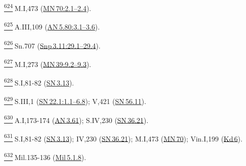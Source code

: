 \label{footprints_split_025.html_fn624}
\hyperref[footprints_split_015.htmlux5cux23fnref624]{\textsuperscript{624}} M.I,473
(\href{https://suttacentral.net/mn70/en/sujato\#2.1}{MN\,70:2.1--2.4}).

\label{footprints_split_025.html_fn625}
\hyperref[footprints_split_015.htmlux5cux23fnref625]{\textsuperscript{625}} A.III,109
(\href{https://suttacentral.net/an5.80/en/sujato\#3.1}{AN\,5.80:3.1--3.6}).

\label{footprints_split_025.html_fn626}
\hyperref[footprints_split_015.htmlux5cux23fnref626]{\textsuperscript{626}} Sn.707
(\href{https://suttacentral.net/snp3.11/en/sujato\#29.1}{Snp\,3.11:29.1--29.4}).

\label{footprints_split_025.html_fn627}
\hyperref[footprints_split_015.htmlux5cux23fnref627]{\textsuperscript{627}} M.I,273
(\href{https://suttacentral.net/mn39/en/sujato\#9.2}{MN\,39:9.2--9.3}).

\label{footprints_split_025.html_fn628}
\hyperref[footprints_split_015.htmlux5cux23fnref628]{\textsuperscript{628}} S.I,81-82
(\href{https://suttacentral.net/sn3.13/en/sujato}{SN\,3.13}).

\label{footprints_split_025.html_fn629}
\hyperref[footprints_split_015.htmlux5cux23fnref629]{\textsuperscript{629}} S.III,1
(\href{https://suttacentral.net/sn22.1/en/sujato\#1.1}{SN\,22.1:1.1--6.8});
V,421 (\href{https://suttacentral.net/sn56.11/en/sujato}{SN\,56.11}).

\label{footprints_split_025.html_fn630}
\hyperref[footprints_split_015.htmlux5cux23fnref630]{\textsuperscript{630}} A.I,173-174
(\href{https://suttacentral.net/an3.61/en/sujato}{AN\,3.61}); S.IV,230
(\href{https://suttacentral.net/sn36.21/en/sujato}{SN\,36.21}).

\label{footprints_split_025.html_fn631}
\hyperref[footprints_split_015.htmlux5cux23fnref631]{\textsuperscript{631}} S.I,81-82
(\href{https://suttacentral.net/sn3.13/en/sujato}{SN\,3.13}); IV,230
(\href{https://suttacentral.net/sn36.21/en/sujato}{SN\,36.21}); M.I,473
(\href{https://suttacentral.net/mn70/en/sujato}{MN\,70}); Vin.I,199
(\href{https://suttacentral.net/pli-tv-kd6/en/brahmali}{Kd\,6}).

\label{footprints_split_025.html_fn632}
\hyperref[footprints_split_015.htmlux5cux23fnref632]{\textsuperscript{632}} Mil.135-136
(\href{https://suttacentral.net/mil5.1.8}{Mil\,5.1.8}).

